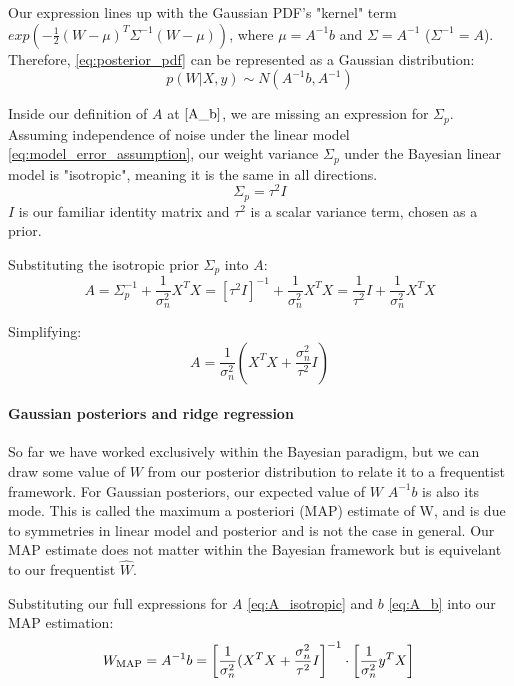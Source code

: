 Our expression lines up with the Gaussian PDF's "kernel" term $exp\left(-\frac{1}{2}(W - \mu)^T\Sigma^{-1}(W - \mu)\right)$, where $\mu = A^{-1}b$ and $\Sigma = A^{-1}$ ($\Sigma^{-1} = A$). Therefore, \ref{eq:posterior_pdf} can be represented as a Gaussian distribution:
\begin{equation} \label{eq:posterior_gaussian}
    p(W|X,y) \sim N(A^{-1}b, A^{-1})
\end{equation}

Inside our definition of $A$ at $\ref{A_b}$, we are missing an expression for $\Sigma_p$. Assuming independence of noise under the linear model \ref{eq:model_error_assumption}, our weight variance $\Sigma_p$ under the Bayesian linear model is "isotropic", meaning it is the same in all directions.
\begin{equation*}
    \Sigma_p = \tau^2 I
\end{equation*}
$I$ is our familiar identity matrix and $\tau^2$ is a scalar variance term, chosen as a prior.

Substituting the isotropic prior $\Sigma_p$ into $A$:
\begin{equation*}
    A = \Sigma_p^{-1} + \frac{1}{\sigma^2_n}X^TX = \left[{\tau^2}I\right]^{-1} + \frac{1}{\sigma^2_n}X^TX =  \frac{1}{\tau^2}I + \frac{1}{\sigma^2_n}X^TX
\end{equation*}

Simplifying:
\begin{equation} \label{eq:A_isotropic}
A = \frac{1}{\sigma_n^2}\left(X^TX + \frac{\sigma_n^2}{\tau^2}I\right)
\end{equation}

\paragraph{Gaussian posteriors and ridge regression}
So far we have worked exclusively within the Bayesian paradigm, but we can draw some value of $W$ from our posterior distribution to relate it to a frequentist framework. For Gaussian posteriors, our expected value of $W$ $A^{-1}b$ is also its mode. This is called the maximum a posteriori (MAP) estimate of W, and is due to symmetries in linear model and posterior and is not the case in general.  Our MAP estimate does not matter within the Bayesian framework but is equivelant to our frequentist $\hat{W}$.

Substituting our full expressions for $A$ \ref{eq:A_isotropic} and $b$ \ref{eq:A_b} into our MAP estimation:
\begin{equation*} 
    W_{\text{MAP}} = A^{-1}b = \left[\frac{1}{\sigma_n^2}(X^TX + \frac{\sigma_n^2}{\tau^2}I\right]^{-1} \cdot \left[\frac{1}{\sigma_n^2}y^TX\right] \\
\end{equation*}

